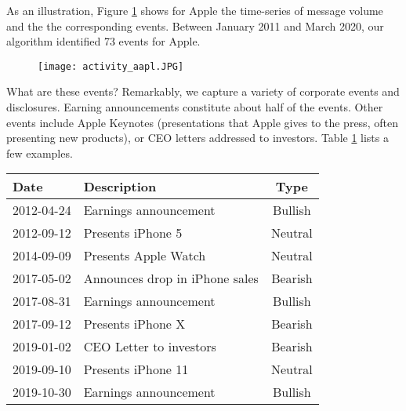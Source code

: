 As an illustration, Figure \ref{fig:activityaapl} shows for Apple the time-series of message volume and the the corresponding events. Between January 2011 and March 2020, our algorithm identified 73 events for Apple. 
\begin{figure}[h!]
    \centering
    \texttt{[image: activity\_aapl.JPG]}
    \label{fig:activityaapl}
\end{figure}
What are these events? Remarkably, we capture a variety of corporate events and disclosures. Earning announcements constitute about half of the events. Other events include Apple Keynotes (presentations that Apple gives to the press, often presenting new products), or CEO letters addressed to investors. Table \ref{tab:event_aapl} lists a few examples.


\begin{table}[h]
\centering
\begin{tabular}{l|l|c}
Date         & Description & Type\\
\hline  
2012-04-24  & Earnings announcement & Bullish\\
2012-09-12  & Presents iPhone 5 & Neutral \\
2014-09-09  & Presents Apple Watch & Neutral \\
2017-05-02  & Announces drop in iPhone sales & Bearish \\
2017-08-31  & Earnings announcement & Bullish \\
2017-09-12  & Presents iPhone X & Bearish \\
2019-01-02  & CEO Letter to investors & Bearish \\
2019-09-10  & Presents iPhone 11 & Neutral \\
2019-10-30  & Earnings announcement & Bullish \\
\end{tabular}
\label{tab:event_aapl}
\end{table}




